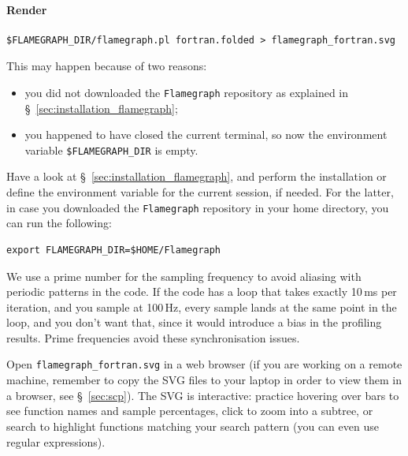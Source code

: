 \documentclass[11pt,a4paper]{article}
\begin{document}
\paragraph{Render}

\begin{lstlisting}[style=bashstyle]
$FLAMEGRAPH_DIR/flamegraph.pl fortran.folded > flamegraph_fortran.svg
\end{lstlisting}

\begin{warnbox}
This may happen because of two reasons:
\begin{itemize}
    \item you did not downloaded the \texttt{Flamegraph} repository as explained in \S~\ref{sec:installation_flamegraph};
    \item you happened to have closed the current terminal, so now the environment variable \texttt{\$FLAMEGRAPH\_DIR} is empty.
\end{itemize}
Have a look at \S~\ref{sec:installation_flamegraph}, and perform the installation or define the environment variable for the current session, if needed.
For the latter, in case you downloaded the \texttt{Flamegraph} repository in your home directory, you can run the following:
\begin{lstlisting}[style=bashstyle]
export FLAMEGRAPH_DIR=$HOME/Flamegraph
\end{lstlisting}
\end{warnbox}

\begin{tipbox}
We use a prime number for the sampling frequency to avoid aliasing with periodic patterns in the code.
If the code has a loop that takes exactly 10\,ms per iteration, and you sample at 100\,Hz, every sample lands at the same point in the loop, and you don't want that, since it would introduce a bias in the profiling results.
Prime frequencies avoid these synchronisation issues.
\end{tipbox}

Open \texttt{flamegraph\_fortran.svg} in a web browser (if you are working on a remote machine, remember to copy the SVG files to your laptop in order to view them in a browser, see \S~\ref{sec:scp}).
The SVG is interactive: practice hovering over bars to see function names and sample percentages, click to zoom into a subtree, or search to highlight functions matching your search pattern (you can even use regular expressions).
\end{document}
